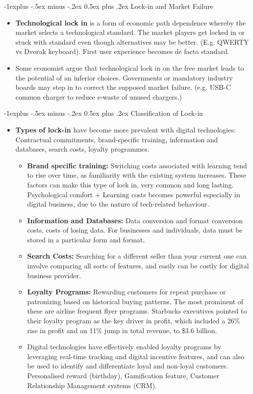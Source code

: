 \documentclass[12pt, landscape]{article}
\makeatletter
\renewcommand{\subsection}{\@startsection{subsection}{2}{0mm}%
                                {-1explus -.5ex minus -.2ex}%
                                {0.5ex plus .2ex}%
                                {\normalfont\normalsize\bfseries}}
\makeatother
\begin{document}
\begin{multicols*}{3}
\subsection{Lock-in and Market Failure}
\begin{itemize}
\item \textbf{Technological lock in} is a form of economic path dependence whereby the market selects a technological standard. The market players get locked in or stuck with standard even though alternatives may be better. (E.g. QWERTY vs Dvorak keyboard). First user experience becomes de facto standard. 
\item Some economist argue that technological lock in on the free market leads to the potential of an inferior choices. Governments or mandatory industry boards may step in to correct the supposed market failure. (e.g. USB-C common charger to reduce e-waste of unused chargers.)
\end{itemize}
\subsection{Classification of Lock-in}
\begin{itemize}
\item \textbf{Types of lock-in} have become more prevalent with digital technologies: Contractual commitments, brand-specific training, information and databases, search costs, loyalty programmes.
\begin{itemize}
\item \textbf{Brand specific training:} Switching costs associated with learning tend to rise over time, as familiarity with the existing system increases. These factors can make this type of lock in, very common and long lasting. Psychological comfort + Learning costs becomes powerful especially in digital business, due to the nature of tech-related behaviour.
\item \textbf{Information and Databases:} Data conversion and format conversion costs, costs of losing data. For businesses and individuals, data must be stored in a particular form and format.
\item \textbf{Search Costs:} Searching for a different seller than your current one can involve comparing all sorts of features, and easily can be costly for digital business provider.
\item \textbf{Loyalty Programs:} Rewarding customers for repeat purchase or patronizing based on historical buying patterns. The most prominent of these are airline frequent flyer programs. Starbucks executives pointed to their loyalty program as the key driver in profit, which included a 26\% rise in profit and an 11\% jump in total revenue, to \$3.6 billion.
\item Digital technologies have effectively enabled loyalty programs by leveraging real-time tracking and digital incentive features, and can also be used to identify and differentiate loyal and non-loyal customers. Personalised reward (birthday), Gamification feature, Customer Relationship Management systems (CRM).
\end{itemize}
\end{itemize}

\end{multicols*}
\end{document}
